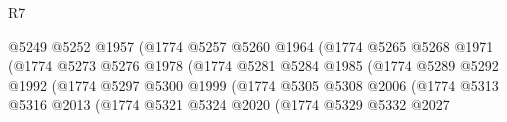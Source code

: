 \begin{lexlean}{R7}
\begin{coremodule}
                                              @5249
                                              @5252
                                              @1957
                                              (@1774
                                                @5257
                                                @5260
                                                @1964
                                                (@1774
                                                  @5265
                                                  @5268
                                                  @1971
                                                  (@1774
                                                    @5273
                                                    @5276
                                                    @1978
                                                    (@1774
                                                      @5281
                                                      @5284
                                                      @1985
                                                      (@1774
                                                        @5289
                                                        @5292
                                                        @1992
                                                        (@1774
                                                          @5297
                                                          @5300
                                                          @1999
                                                          (@1774
                                                            @5305
                                                            @5308
                                                            @2006
                                                            (@1774
                                                              @5313
                                                              @5316
                                                              @2013
                                                              (@1774
                                                                @5321
                                                                @5324
                                                                @2020
                                                                (@1774
                                                                  @5329
                                                                  @5332
                                                                  @2027

\end{coremodule}
\end{lexlean}
